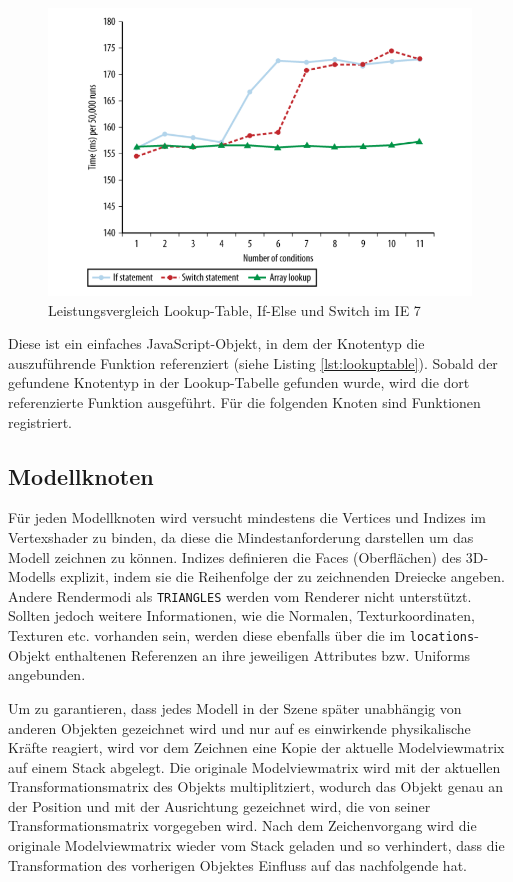 \begin{figure}
\centering
\includegraphics[width=\textwidth]{bilder/lookup_vergleich.png}
\caption{Leistungsvergleich Lookup-Table, If-Else und Switch im IE 7 \autocite{HighPerformanceJS}}
\label{fig:lookupvergleich}
\end{figure}
Diese ist ein einfaches JavaScript-Objekt, in dem der Knotentyp die auszuführende Funktion referenziert (siehe Listing \ref{lst:lookuptable}).
Sobald der gefundene Knotentyp in der Lookup-Tabelle gefunden wurde, wird die dort referenzierte Funktion ausgeführt. Für die folgenden Knoten sind Funktionen registriert.

\subsection{Modellknoten}
Für jeden Modellknoten wird versucht mindestens die Vertices und Indizes im Vertexshader zu binden, da diese die Mindestanforderung darstellen um das Modell zeichnen zu können. Indizes definieren die Faces (Oberflächen) des 3D-Modells explizit, indem sie die Reihenfolge der zu zeichnenden Dreiecke angeben. Andere Rendermodi als \texttt{TRIANGLES} werden vom Renderer nicht unterstützt. Sollten jedoch weitere Informationen, wie die Normalen, Texturkoordinaten, Texturen etc. vorhanden sein, werden diese ebenfalls über die im \texttt{locations}-Objekt enthaltenen Referenzen an ihre jeweiligen Attributes bzw. Uniforms angebunden.

Um zu garantieren, dass jedes Modell in der Szene später unabhängig von anderen Objekten gezeichnet wird und nur auf es einwirkende physikalische Kräfte reagiert, wird vor dem Zeichnen eine Kopie der aktuelle Modelviewmatrix auf einem Stack abgelegt. Die originale Modelviewmatrix wird mit der aktuellen Transformationsmatrix des Objekts multiplitziert, wodurch das Objekt genau an der Position und mit der Ausrichtung gezeichnet wird, die von seiner Transformationsmatrix vorgegeben wird. Nach dem Zeichenvorgang wird die originale Modelviewmatrix wieder vom Stack geladen und so verhindert, dass die Transformation des vorherigen Objektes Einfluss auf das nachfolgende hat.

